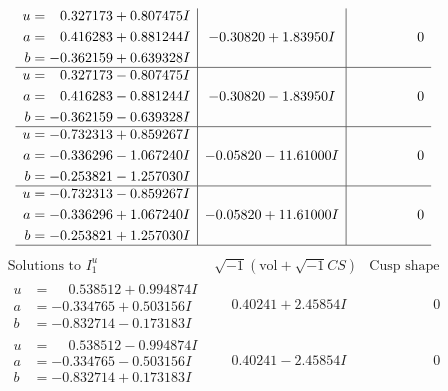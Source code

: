 \documentclass[1p]{elsarticle_modified}
\theoremstyle{definition}
\newcommand{\I}{\sqrt{-1}}
\begin{document}
$$\begin{array}{c|c|c}
\begin{aligned}
u &= \phantom{-}0.327173 + 0.807475 I \\
a &= \phantom{-}0.416283 + 0.881244 I \\
b &= -0.362159 + 0.639328 I\end{aligned}
 & -0.30820 + 1.83950 I & \phantom{-0.000000 } 0 \\ \hline\begin{aligned}
u &= \phantom{-}0.327173 - 0.807475 I \\
a &= \phantom{-}0.416283 - 0.881244 I \\
b &= -0.362159 - 0.639328 I\end{aligned}
 & -0.30820 - 1.83950 I & \phantom{-0.000000 } 0 \\ \hline\begin{aligned}
u &= -0.732313 + 0.859267 I \\
a &= -0.336296 - 1.067240 I \\
b &= -0.253821 - 1.257030 I\end{aligned}
 & -0.05820 - 11.61000 I & \phantom{-0.000000 } 0 \\ \hline\begin{aligned}
u &= -0.732313 - 0.859267 I \\
a &= -0.336296 + 1.067240 I \\
b &= -0.253821 + 1.257030 I\end{aligned}
 & -0.05820 + 11.61000 I & \phantom{-0.000000 } 0\\
 \hline 
 \end{array}$$\newpage$$\begin{array}{c|c|c}  
\text{Solutions to }I^u_{1}& \I (\text{vol} + \sqrt{-1}CS) & \text{Cusp shape}\\
 \hline 
\begin{aligned}
u &= \phantom{-}0.538512 + 0.994874 I \\
a &= -0.334765 + 0.503156 I \\
b &= -0.832714 - 0.173183 I\end{aligned}
 & \phantom{-}0.40241 + 2.45854 I & \phantom{-0.000000 } 0 \\ \hline\begin{aligned}
u &= \phantom{-}0.538512 - 0.994874 I \\
a &= -0.334765 - 0.503156 I \\
b &= -0.832714 + 0.173183 I\end{aligned}
 & \phantom{-}0.40241 - 2.45854 I & \phantom{-0.000000 } 0 \\ \hline\begin{aligned}

\end{aligned}
\end{array}$$
\end{document}

